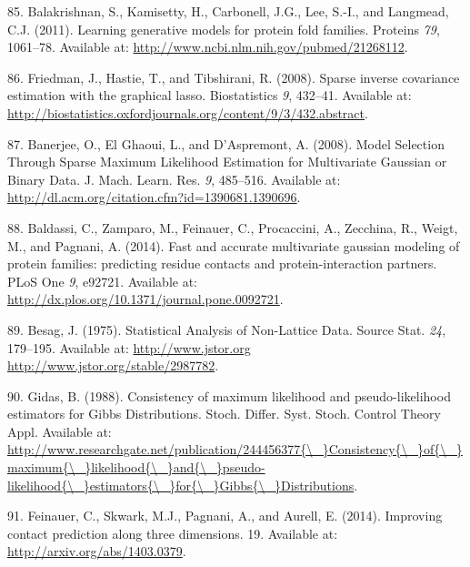 \documentclass[12pt,a4paper,twoside]{book}
\theoremstyle{definition}
\theoremstyle{definition}
\theoremstyle{remark}
\begin{document}
\hypertarget{ref-Balakrishnan2011}{}
85. Balakrishnan, S., Kamisetty, H., Carbonell, J.G., Lee, S.-I., and
Langmead, C.J. (2011). Learning generative models for protein fold
families. Proteins \emph{79}, 1061--78. Available at:
\url{http://www.ncbi.nlm.nih.gov/pubmed/21268112}.

\hypertarget{ref-Friedman2008}{}
86. Friedman, J., Hastie, T., and Tibshirani, R. (2008). Sparse inverse
covariance estimation with the graphical lasso. Biostatistics \emph{9},
432--41. Available at:
\url{http://biostatistics.oxfordjournals.org/content/9/3/432.abstract}.

\hypertarget{ref-Banerjee2008}{}
87. Banerjee, O., El Ghaoui, L., and D'Aspremont, A. (2008). Model
Selection Through Sparse Maximum Likelihood Estimation for Multivariate
Gaussian or Binary Data. J. Mach. Learn. Res. \emph{9}, 485--516.
Available at: \url{http://dl.acm.org/citation.cfm?id=1390681.1390696}.

\hypertarget{ref-Baldassi2014}{}
88. Baldassi, C., Zamparo, M., Feinauer, C., Procaccini, A., Zecchina,
R., Weigt, M., and Pagnani, A. (2014). Fast and accurate multivariate
gaussian modeling of protein families: predicting residue contacts and
protein-interaction partners. PLoS One \emph{9}, e92721. Available at:
\url{http://dx.plos.org/10.1371/journal.pone.0092721}.

\hypertarget{ref-Besag1975}{}
89. Besag, J. (1975). Statistical Analysis of Non-Lattice Data. Source
Stat. \emph{24}, 179--195. Available at:
\href{http://www.jstor.org\%20http://www.jstor.org/stable/2987782}{http://www.jstor.org http://www.jstor.org/stable/2987782}.

\hypertarget{ref-Gidas1988}{}
90. Gidas, B. (1988). Consistency of maximum likelihood and
pseudo-likelihood estimators for Gibbs Distributions. Stoch. Differ.
Syst. Stoch. Control Theory Appl. Available at:
\href{http://www.researchgate.net/publication/244456377\%7B/_\%7DConsistency\%7B/_\%7Dof\%7B/_\%7Dmaximum\%7B/_\%7Dlikelihood\%7B/_\%7Dand\%7B/_\%7Dpseudo-likelihood\%7B/_\%7Destimators\%7B/_\%7Dfor\%7B/_\%7DGibbs\%7B/_\%7DDistributions}{http://www.researchgate.net/publication/244456377\{\textbackslash{}\_\}Consistency\{\textbackslash{}\_\}of\{\textbackslash{}\_\}maximum\{\textbackslash{}\_\}likelihood\{\textbackslash{}\_\}and\{\textbackslash{}\_\}pseudo-likelihood\{\textbackslash{}\_\}estimators\{\textbackslash{}\_\}for\{\textbackslash{}\_\}Gibbs\{\textbackslash{}\_\}Distributions}.

\hypertarget{ref-Feinauer2014}{}
91. Feinauer, C., Skwark, M.J., Pagnani, A., and Aurell, E. (2014).
Improving contact prediction along three dimensions. 19. Available at:
\url{http://arxiv.org/abs/1403.0379}.
\end{document}
